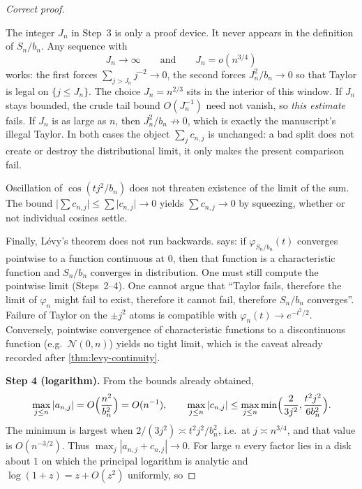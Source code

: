\documentclass[11pt,a4paper]{article}
\begin{document}
\begin{proof}[Correct proof]
\begin{remark}
The integer \(J_{n}\) in Step~3 is only a proof device. It never appears in the definition of \(S_{n}/b_{n}\). Any sequence with
\[
J_{n}\to\infty
\qquad\text{and}\qquad
J_{n}=o(n^{3/4})
\]
works: the first forces \(\sum_{j>J_{n}}j^{-2}\to 0\), the second forces \(J_{n}^{2}/b_{n}\to 0\) so that Taylor is legal on \(\{j\le J_{n}\}\). The choice \(J_{n}=n^{2/3}\) sits in the interior of this window. If \(J_{n}\) stays bounded, the crude tail bound \(O(J_{n}^{-1})\) need not vanish, so \emph{this estimate} fails. If \(J_{n}\) is as large as \(n\), then \(J_{n}^{2}/b_{n}\not\to 0\), which is exactly the manuscript's illegal Taylor. In both cases the object \(\sum_{j}c_{n,j}\) is unchanged: a bad split does not create or destroy the distributional limit, it only makes the present comparison fail.

Oscillation of \(\cos(tj^{2}/b_{n})\) does not threaten existence of the limit of the sum. The bound \(\lvert\sum c_{n,j}\rvert\le\sum\lvert c_{n,j}\rvert\to 0\) yields \(\sum c_{n,j}\to 0\) by squeezing, whether or not individual cosines settle.

Finally, Lévy's theorem does not run backwards.  says: if \(\varphi_{S_{n}/b_{n}}(t)\) converges pointwise to a function continuous at \(0\), then that function is a characteristic function and \(S_{n}/b_{n}\) converges in distribution. One must still compute the pointwise limit (Steps~2--4). One cannot argue that ``Taylor fails, therefore the limit of \(\varphi_{n}\) might fail to exist, therefore it cannot fail, therefore \(S_{n}/b_{n}\) converges''. Failure of Taylor on the \(\pm j^{2}\) atoms is compatible with \(\varphi_{n}(t)\to e^{-t^{2}/2}\). Conversely, pointwise convergence of characteristic functions to a discontinuous function (e.g.\ \(\mathcal{N}(0,n)\)) yields no tight limit, which is the caveat already recorded after \cref{thm:levy-continuity}.
\end{remark}

\textbf{Step 4 (logarithm).}
From the bounds already obtained,
\[
\max_{j\le n}|a_{n,j}|
=
O\Bigl(\frac{n^{2}}{b_{n}^{2}}\Bigr)
=
O(n^{-1}),
\qquad
\max_{j\le n}|c_{n,j}|
\le
\max_{j\le n}\min\Bigl(\frac{2}{3j^{2}},\frac{t^{2}j^{2}}{6b_{n}^{2}}\Bigr).
\]
The minimum is largest when \(2/(3j^{2})\asymp t^{2}j^{2}/b_{n}^{2}\), i.e.\ at \(j\asymp n^{3/4}\), and that value is \(O(n^{-3/2})\). Thus \(\max_{j}|a_{n,j}+c_{n,j}|\to 0\). For large \(n\) every factor lies in a disk about \(1\) on which the principal logarithm is analytic and \(\log(1+z)=z+O(z^{2})\) uniformly, so


\end{proof}
\end{document}
